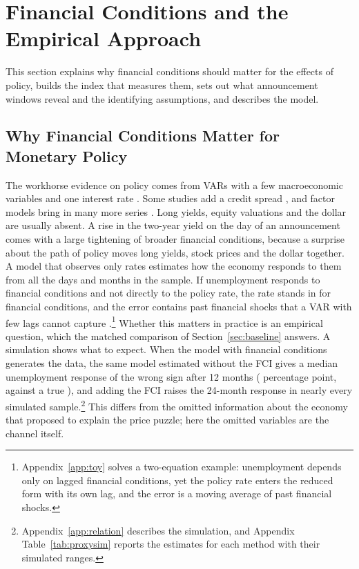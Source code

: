 \documentclass[11pt]{article}
\begin{document}
\FloatBarrier
\section{Financial Conditions and the Empirical Approach}\label{sec:data}
This section explains why financial conditions should matter for the effects of policy, builds the index that measures them, sets out what announcement windows reveal and the identifying assumptions, and describes the model.

\subsection{Why Financial Conditions Matter for Monetary Policy}\label{sec:background}
The workhorse evidence on policy comes from VARs with a few macroeconomic variables and one interest rate \citep{bernanke1992,christiano1999}. Some studies add a credit spread \citep{gertler2015,caldara2019}, and factor models bring in many more series \citep{bernanke2005favar}. Long yields, equity valuations and the dollar are usually absent. A rise in the two-year yield on the day of an announcement comes with a large tightening of broader financial conditions, because a surprise about the path of policy moves long yields, stock prices and the dollar together. A model that observes only rates estimates how the economy responds to them from all the days and months in the sample. If unemployment responds to financial conditions and not directly to the policy rate, the rate stands in for financial conditions, and the error contains past financial shocks that a VAR with few lags cannot capture \citep{fernandez2007}.\footnote{Appendix~\ref{app:toy} solves a two-equation example: unemployment depends only on lagged financial conditions, yet the policy rate enters the reduced form with its own lag, and the error is a moving average of past financial shocks.} Whether this matters in practice is an empirical question, which the matched comparison of Section~\ref{sec:baseline} answers. A simulation shows what to expect. When the model with financial conditions generates the data, the same model estimated without the FCI gives a median unemployment response of the wrong sign after 12 months ( percentage point, against a true ), and adding the FCI raises the 24-month response in nearly every simulated sample.\footnote{Appendix~\ref{app:relation} describes the simulation, and Appendix Table~\ref{tab:proxysim} reports the estimates for each method with their simulated ranges.} This differs from the omitted information about the economy that \citet{sims1992} proposed to explain the price puzzle; here the omitted variables are the channel itself.
\end{document}
